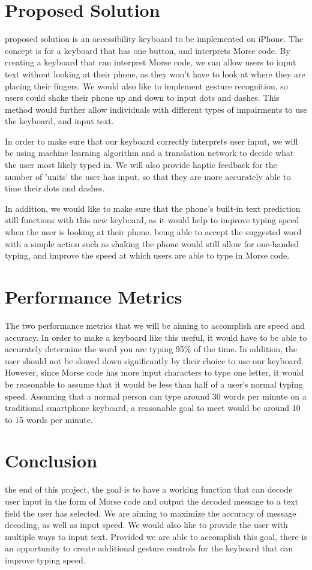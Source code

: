 \documentclass[journal,draftclsnofoot,onecolumn]{IEEEtran}
\begin{document}
\section{Proposed Solution}
 proposed solution is an accessibility keyboard to be implemented on iPhone. The concept is for a keyboard that has one button, and interprets Morse code. By creating a keyboard that can interpret Morse code, we can allow users to input text without looking at their phone, as they won't have to look at where they are placing their fingers. We would also like to implement gesture recognition, so users could shake their phone up and down to input dots and dashes. This method would further allow individuals with different types of impairments to use the keyboard, and input text.

In order to make sure that our keyboard correctly interprets user input, we will be using machine learning algorithm and a translation network to decide what the user most likely typed in. We will also provide haptic feedback for the number of 'units' the user has input, so that they are more accurately able to time their dots and dashes.

In addition, we would like to make sure that the phone's built-in text prediction still functions with this new keyboard, as it would help to improve typing speed when the user is looking at their phone. being able to accept the suggested word with a simple action such as shaking the phone would still allow for one-handed typing, and improve the speed at which users are able to type in Morse code.

\section{Performance Metrics}
The two performance metrics that we will be aiming to accomplish are speed and accuracy. In order to make a keyboard like this useful, it would have to be able to accurately determine the word you are typing 95\% of the time. In addition, the user should not be slowed down significantly by their choice to use our keyboard. However, since Morse code has more input characters to type one letter, it would be reasonable to assume that it would be less than half of a user's normal typing speed. Assuming that a normal person can type around 30 words per minute on a traditional smartphone keyboard, a reasonable goal to meet would be around 10 to 15 words per minute.

\section{Conclusion}
 the end of this project, the goal is to have a working function that can decode user input in the form of Morse code and output the decoded message to a text field the user has selected. We are aiming to maximize the accuracy of message decoding, as well as input speed. We would also like to provide the user with multiple ways to input text. Provided we are able to accomplish this goal, there is an opportunity to create additional gesture controls for the keyboard that can improve typing speed.
\end{document}
